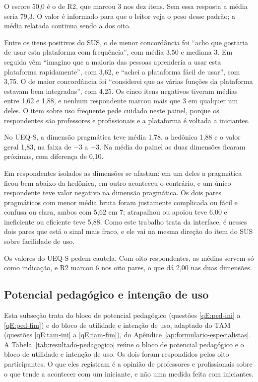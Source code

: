 O escore 50,0 é o de R2, que marcou 3 nos dez itens. Sem essa resposta a média seria 79,3. O valor é informado para que o leitor veja o peso desse padrão; a média relatada continua sendo a dos oito.

Entre os itens positivos do SUS, o de menor concordância foi ``acho que gostaria de usar esta plataforma com frequência'', com média 3,50 e mediana 3. Em seguida vêm ``imagino que a maioria das pessoas aprenderia a usar esta plataforma rapidamente'', com 3,62, e ``achei a plataforma fácil de usar'', com 3,75. O de maior concordância foi ``considerei que as várias funções da plataforma estavam bem integradas'', com 4,25. Os cinco itens negativos tiveram médias entre 1,62 e 1,88, e nenhum respondente marcou mais que 3 em qualquer um deles. O item sobre uso frequente pede cuidado neste painel, porque os respondentes são professores e profissionais e a plataforma é voltada a iniciantes.

No UEQ-S, a dimensão pragmática teve média 1,78, a hedônica 1,88 e o valor geral 1,83, na faixa de $-3$ a $+3$. Na média do painel as duas dimensões ficaram próximas, com diferença de 0,10.

Em respondentes isolados as dimensões se afastam: em um deles a pragmática ficou bem abaixo da hedônica, em outro aconteceu o contrário, e um único respondente teve valor negativo na dimensão pragmática. Os dois pares pragmáticos com menor média bruta foram justamente complicada ou fácil e confusa ou clara, ambos com 5,62 em 7; atrapalhou ou apoiou teve 6,00 e ineficiente ou eficiente teve 5,88. Como este trabalho trata da interface, é nesses dois pares que está o sinal mais fraco, e ele vai na mesma direção do item do SUS sobre facilidade de uso.

Os valores do UEQ-S pedem cautela. Com oito respondentes, as médias servem só como indicação, e R2 marcou 6 nos oito pares, o que dá 2,00 nas duas dimensões.

\subsection{Potencial pedagógico e intenção de uso}
\label{sec:resultado-pedagogico}

Esta subseção trata do bloco de potencial pedagógico (questões \ref{qE:ped-ini} a \ref{qE:ped-fim}) e do bloco de utilidade e intenção de uso, adaptado do TAM (questões \ref{qE:tam-ini} a \ref{qE:tam-fim}), do Apêndice~\ref{ap:formulario-especialistas}. A Tabela~\ref{tab:resultado-pedagogico} reúne o bloco de potencial pedagógico e o bloco de utilidade e intenção de uso. Os dois foram respondidos pelos oito participantes. O que eles registram é a opinião de professores e profissionais sobre o que tende a acontecer com um iniciante, e não uma medida feita com iniciantes.


